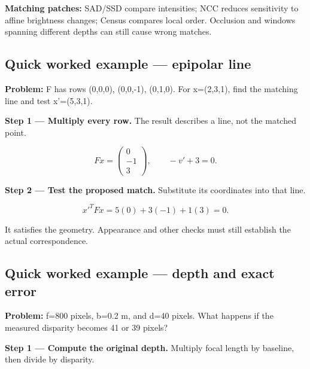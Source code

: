 \documentclass[11pt,letterpaper]{article}
\begin{document}
\textbf{Matching patches:} SAD/SSD compare intensities; NCC reduces sensitivity to affine brightness changes; Census compares local order. Occlusion and windows spanning different depths can still cause wrong matches.



\subsection*{Quick worked example — epipolar line}


\textbf{Problem:} F has rows (0,0,0), (0,0,-1), (0,1,0). For x=(2,3,1), find the matching line and test x'=(5,3,1).



\textcolor{StepRed}{\textbf{Step 1 — Multiply every row.} The result describes a line, not the matched point.}



\begin{tcolorbox}\color{MathBlue}\[Fx=\begin{pmatrix}0\\-1\\3\end{pmatrix},\qquad -v'+3=0.\]\end{tcolorbox}


\textcolor{StepRed}{\textbf{Step 2 — Test the proposed match.} Substitute its coordinates into that line.}



\begin{tcolorbox}\color{MathBlue}\[x'^TFx=5(0)+3(-1)+1(3)=0.\]\end{tcolorbox}


It satisfies the geometry. Appearance and other checks must still establish the actual correspondence.



\subsection*{Quick worked example — depth and exact error}


\textbf{Problem:} f=800 pixels, b=0.2 m, and d=40 pixels. What happens if the measured disparity becomes 41 or 39 pixels?



\textcolor{StepRed}{\textbf{Step 1 — Compute the original depth.} Multiply focal length by baseline, then divide by disparity.}
\end{document}
